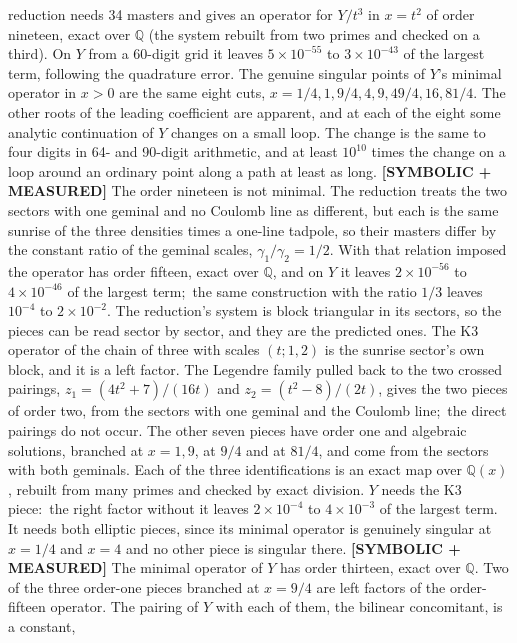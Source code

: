 \documentclass[aps,pra,twocolumn,superscriptaddress,longbibliography]{revtex4-2}
\begin{document}
reduction needs 34 masters and gives an operator for $Y/t^3$ in $x=t^2$ of
order nineteen, exact over $\mathbb{Q}$ (the system rebuilt from two primes
and checked on a third).  On $Y$ from a 60-digit grid it leaves
$5\times10^{-55}$ to $3\times10^{-43}$ of the largest term, following the
quadrature error.  The genuine singular points of $Y$'s minimal operator in
$x>0$ are the same eight cuts, $x=1/4,1,9/4,4,9,49/4,16,81/4$.  The other
roots of the leading coefficient are apparent, and at each of the eight some
analytic continuation of $Y$ changes on a small loop.  The change is the
same to four digits in 64- and 90-digit arithmetic, and at least $10^{10}$
times the change on a loop around an ordinary point along a path at least as
long.  \textbf{[SYMBOLIC + MEASURED]} The order nineteen is not minimal.  The
reduction treats the two sectors with one geminal and no Coulomb line as
different, but each is the same sunrise of the three densities times a
one-line tadpole, so their masters differ by the constant ratio of the
geminal scales, $\gamma_1/\gamma_2=1/2$.  With that relation imposed the
operator has order fifteen, exact over $\mathbb{Q}$, and on $Y$ it leaves
$2\times10^{-56}$ to $4\times10^{-46}$ of the largest term;\ the same
construction with the ratio $1/3$ leaves $10^{-4}$ to $2\times10^{-2}$.  The
reduction's system is block triangular in its sectors, so the pieces can be
read sector by sector, and they are the predicted ones.  The K3 operator of
the chain of three with scales $(t;1,2)$ is the sunrise sector's own block, and
it is a left factor.  The Legendre family pulled back to the two crossed
pairings, $z_1=(4t^2+7)/(16t)$ and $z_2=(t^2-8)/(2t)$, gives the two pieces of
order two, from the sectors with one geminal and the Coulomb line;\ the direct
pairings do not occur.  The other seven pieces have order one and algebraic
solutions, branched at $x=1,9$, at $9/4$ and at $81/4$, and come from the
sectors with both geminals.  Each of the three identifications is an exact map
over $\mathbb{Q}(x)$, rebuilt from many primes and checked by exact division.
$Y$ needs the K3 piece:\ the right factor without it leaves $2\times10^{-4}$ to
$4\times10^{-3}$ of the largest term.  It needs both elliptic pieces, since its
minimal operator is genuinely singular at $x=1/4$ and $x=4$ and no other piece
is singular there.  \textbf{[SYMBOLIC + MEASURED]} The minimal operator of
$Y$ has order thirteen, exact over $\mathbb{Q}$.  Two of the three order-one
pieces branched at $x=9/4$ are left factors of the order-fifteen operator.
The pairing of $Y$ with each of them, the bilinear concomitant, is a constant,
\end{document}
